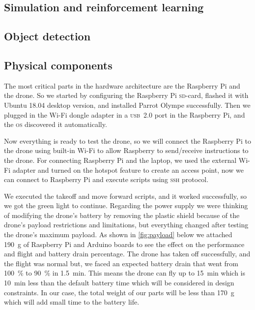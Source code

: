 \documentclass[../main.tex]{subfiles}
\begin{document}
\subsection{Simulation and reinforcement learning}

\lipsum[1]

\subsection{Object detection}

\lipsum[1]

\subsection{Physical components}

The most critical parts in the hardware
architecture are the Raspberry Pi and the drone. 
So we started by configuring the Raspberry Pi 
\textsc{sd}-card,
flashed it with Ubuntu 18.04 desktop version,
and installed Parrot Olympe successfully. 
Then we plugged in the Wi-Fi dongle adapter
in a \textsc{usb}~2.0 port in the Raspberry Pi, 
and the \textsc{os} discovered it automatically. 

Now everything is ready to test the 
\anafi drone, so we will connect the
Raspberry Pi to the drone using built-in Wi-Fi
to allow Raspberry to send/receive instructions
to the drone. 
For connecting Raspberry Pi and the laptop, 
we used the external Wi-Fi adapter and turned on the hotspot feature to create an access point,
now we can connect to Raspberry Pi and execute 
scripts using \textsc{ssh} protocol.

We executed the takeoff and move forward scripts,
and it worked successfully, so we got the green 
light to continue. 
Regarding the power supply we were thinking of modifying the drone's battery
by removing the plastic shield because of the drone's
payload restrictions and limitations, but everything changed after 
testing the drone's maximum payload. As shown in \cref{fig:payload} below
we attached \SI{190}{\gram} of Raspberry Pi and Arduino boards
to see the effect on the performance and flight and
battery drain percentage. 
The drone has taken off  successfully, 
and the flight was normal but, we faced an expected 
battery drain that went from 
\SI{100}{\percent} to \SI{90}{\percent} in 
\SI{1.5}{\minute}.
This means the drone can fly up to 
\SI{15}{\minute} which is \SI{10}{\minute} 
less than the default battery time 
which will be considered in design constraints.
In our case, the total weight of our parts will be 
less than 
\SI{170}{\gram} 
which will add small time to the battery life.
\end{document}
